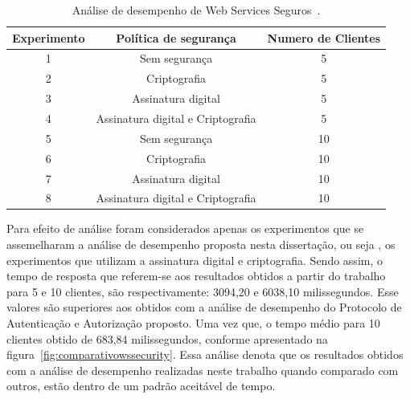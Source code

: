 \begin{table}[h]
\begin{tabular}{|c|c|c|}
\hline
\textbf{Experimento} & \textbf{Política de segurança}     & \textbf{Numero de Clientes} \\ \hline
1                    & Sem segurança                      & 5                           \\ \hline
2                    & Criptografia                       & 5                           \\ \hline
3                    & Assinatura digital                 & 5                           \\ \hline
4                    & Assinatura digital e Criptografia  & 5                           \\ \hline
5                    & Sem segurança                      & 10                           \\ \hline
6                    & Criptografia                       & 10                           \\ \hline
7                    & Assinatura digital                 & 10                           \\ \hline
8                    & Assinatura digital e Criptografia  & 10                          \\ \hline
\end{tabular}\caption {Análise de desempenho de Web Services Seguros~\cite{rodrigues2011analysis}.}\label{tb:expWSSecurity}
\end{table}

Para efeito de análise foram considerados apenas os experimentos que se assemelharam a análise de desempenho proposta nesta dissertação, ou seja , os experimentos que utilizam a assinatura digital e criptografia. Sendo assim, o tempo de resposta  que referem-se aos resultados obtidos a partir do trabalho~\cite{rodrigues2011analysis} para  5 e 10 clientes, são respectivamente: 3094,20 e 6038,10 milissegundos. Esse valores são superiores aos obtidos com a análise de desempenho do Protocolo de Autenticação e Autorização proposto. Uma vez que, o tempo médio para 10 clientes obtido de 683,84 milissegundos, conforme apresentado na figura~\ref{fig:comparativowssecurity}. Essa análise denota que os resultados obtidos com a análise de desempenho realizadas neste trabalho quando comparado com outros, estão dentro de um padrão aceitável de tempo.

